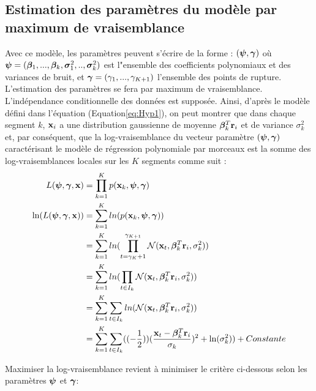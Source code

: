 \documentclass[12pt]{article}
\begin{document}
\subsection{Estimation des paramètres du modèle par maximum de vraisemblance}
\label{ssec: 2-2}
\smallbreak
Avec ce modèle, les paramètres peuvent s'écrire de la forme : $(\boldsymbol{\psi},\boldsymbol{\gamma})$ où  $\boldsymbol{\psi}=(\boldsymbol{\beta}_{1},...,\boldsymbol{\beta}_{k},\boldsymbol{\sigma}^2_{1},..,\boldsymbol{\sigma}^2_{k})$ est l"ensemble des coefficients polynomiaux et des variances de bruit, et $\boldsymbol{\gamma}=(\gamma_{1},...,\gamma_{K+1})$ l'ensemble des points de rupture. L'estimation des paramètres se fera par maximum de vraisemblance. L'indépendance conditionnelle des données est supposée. Ainsi, d'après le modèle défini dans l'équation  (Equation\ref{eq:Hyp1}), on peut montrer que dans chaque segment $k$, ${\mathbf{x}}_{i}$ a une distribution gaussienne de moyenne $\boldsymbol{\beta}^{T}_{k}\mathbf{r}_{i}$ et de variance $\sigma^2_{k}$ et, par conséquent, que la log-vraisemblance du vecteur paramètre $(\boldsymbol{\psi},\boldsymbol{\gamma})$ caractérisant le modèle de régression polynomiale par morceaux est la somme des log-vraisemblances locales sur les $K$ segments comme suit :
\begin{equation}
\begin{split}
 L(\boldsymbol{\psi},\boldsymbol{\gamma},{\mathbf{x}}) & = \prod_{k=1}^{K}p({\mathbf{x}}_{k},\boldsymbol{\psi},\boldsymbol{\gamma}) \\
\ln(L(\boldsymbol{\psi},\boldsymbol{\gamma},{\mathbf{x}})) & = \sum_{k=1}^{K} ln(p({\mathbf{x}}_{k},\boldsymbol{\psi},\boldsymbol{\gamma})) \\
&                  = \sum_{k=1}^{K} ln( \prod_{t=\gamma_{K}+1}^{\gamma_{K+1}}   \mathcal{N}({\mathbf{x}}_{t},\boldsymbol{\beta}^{T}_{k}\mathbf{r}_{i},\sigma^2_{k}))\\
&       			 = \sum_{k=1}^{K} ln( \prod_{t \in I_k}   \mathcal{N}({\mathbf{x}}_{t},\boldsymbol{\beta}^{T}_{k}\mathbf{r}_{i},\sigma^2_{k}))\\
&       			 = \sum_{k=1}^{K} \sum_{t \in I_k}  ln(  \mathcal{N}({\mathbf{x}}_{t},\boldsymbol{\beta}^{T}_{k}\mathbf{r}_{i},\sigma^2_{k}))\\
&       			 = \sum_{k=1}^{K} \sum_{t \in I_k}  ((-\frac{1}{2}))(\frac{{\mathbf{x}}_{t}-\boldsymbol{\beta}^{T}_{k}\mathbf{r}_{i}}{\sigma_{k}})^2 + \ln (\sigma^2_{k}))+Constante\\
\label{eq:Hyp2}
\end{split}
\end{equation}

Maximiser la log-vraisemblance revient à minimiser le critère ci-dessous selon les paramètres $\boldsymbol{\psi}$ et $\boldsymbol{\gamma}$:
\end{document}
